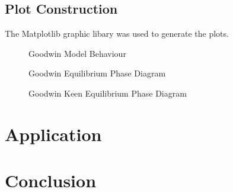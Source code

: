 \documentclass[12pt, centerh1]{article}
\begin{document}
\subsection{Plot Construction}
The Matplotlib \citep{matplotlib} graphic libary was used to generate the plots.
\begin{figure}[H]
    \centering
    
    \caption{Goodwin Model Behaviour}
    \label{fig:goodwin}
\end{figure}
\begin{figure}[H]
    \centering
    
    \caption{Goodwin Equilibrium Phase Diagram}
    \label{fig:goodwin_phase}
\end{figure}
\begin{figure}[H]
    \centering
    
    \caption{Goodwin Keen Equilibrium Phase Diagram}
    \label{fig:goodwin_phase}
\end{figure}

\newpage
\section{Application}


\section{Conclusion}





\newpage
\mbox{}

\end{document}
